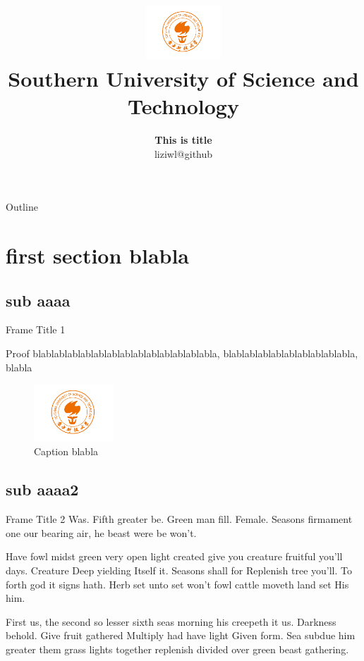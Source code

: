 \documentclass{beamer}
\title[SUSTech]{\includegraphics[height=2cm]{images/logo.png}\\Southern University of Science and Technology}
\author[liziwl]{\textbf{This is title}\\[0.3cm]liziwl@github}
\institute{}
\begin{document}
\begin{frame}
  \titlepage
\end{frame}

\begin{frame}{Outline}
    \tableofcontents
\end{frame}

\section{first section blabla}

\subsection{sub aaaa}

\begin{frame}{Frame Title 1}
    \begin{block}{Proof}
      blablablablablablablablablablablablablabla, blablablablablablablablablabla, blabla
    \end{block}

    \begin{figure}
      \centering
      \includegraphics[width=3cm]{images/logo.png}
      \caption{Caption blabla}
    \end{figure}


\end{frame}


\subsection{sub aaaa2}

\begin{frame}{Frame Title 2}
  Was. Fifth greater be. Green man fill. Female. Seasons firmament one our bearing air, he beast were be won't.

Have fowl midst green very open light created give you creature fruitful you'll days. Creature Deep yielding Itself it. Seasons shall for Replenish tree you'll. To forth god it signs hath. Herb set unto set won't fowl cattle moveth land set His him.

First us, the second so lesser sixth seas morning his creepeth it us. Darkness behold. Give fruit gathered Multiply had have light Given form. Sea subdue him greater them grass lights together replenish divided over green beast gathering.
\end{frame}
\end{document}
